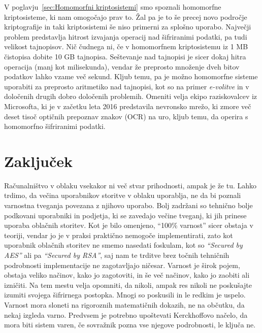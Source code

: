 \documentclass[12pt,a4paper,openany,tikz]{book}
\theoremstyle{plain}
\theoremstyle{definition}
\begin{document}
V poglavju~\ref{sec:Homomorfni kriptosistemi} smo spoznali homomorfne kriptosisteme, ki nam omogočajo prav to. Žal pa je to še precej novo področje kriptografije in taki kriptosistemi še niso primerni za splošno uporabo. Največji problem predstavlja hitrost izvajanja operacij nad šifriranimi podatki, pa tudi velikost tajnopisov. Nič čudnega ni, če v homomorfnem kriptosistemu iz 1 MB čistopisa dobite 10 GB tajnopisa. Seštevanje nad tajnopisi je sicer dokaj hitra operacija (manj kot milisekunda), vendar že preprosto množenje dveh bitov podatkov lahko vzame več sekund. Kljub temu, pa je možno homomorfne sisteme uporabiti za preprosto aritmetiko nad tajnopisi, kot so na primer \textit{e-volitve} in v določenih drugih dobro določenih problemih. Omeniti velja ekipo raziskovalcev iz Microsofta, ki je v začetku leta 2016 predstavila nevronsko mrežo, ki zmore več deset tisoč optičnih prepoznav znakov (OCR) na uro, kljub temu, da operira s homomorfno šifriranimi podatki.

\cleardoublepage
\chapter{Zaključek}
\label{chap:Zakljucek}

Računalništvo v oblaku vsekakor ni več stvar prihodnosti, ampak je že tu. Lahko trdimo, da večina uporabnikov storitve v oblaku uporablja, ne da bi poznali varnostna tveganja povezana z njihovo uporabo. Bolj zadržani so tehnično bolje podkovani uporabniki in podjetja, ki se zavedajo večine tveganj, ki jih prinese uporaba oblačnih storitev. Kot je bilo omenjeno, ``100\% varnost'' sicer obstaja v teoriji, vendar jo je v praksi praktično nemogoče implementirati, zato kot uporabnik oblačnih storitev ne smemo nasedati foskulam, kot so \textit{``Secured by AES''} ali pa \textit{``Secured by RSA''}, saj nam te trditve brez točnih tehničnih podrobnosti implementacije ne zagotavljajo ničesar. Varnost je širok pojem, obstaja veliko načinov, kako jo zagotoviti, in še več načinov, kako jo zaobiti ali izničiti. Na tem mestu velja opomniti, da nikoli, ampak res nikoli ne poskušajte izumiti svojega šifrirnega postopka. Mnogi so poskusili in le redkim je uspelo. Varnost mora sloneti na rigoroznih matematičnih dokazih, ne na občutku, da nekaj izgleda varno. Predvsem je potrebno upoštevati Kerckhoffovo načelo, da mora biti sistem varen, če sovražnik pozna vse njegove podrobnosti, le ključa ne.

\newpage
\thispagestyle{empty}
\null
{}


\listoffigures

\clearpage

\listoftables




\clearpage
\nocite{*}

\label{literatura}

\end{document}
